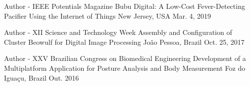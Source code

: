 

\begin{cventries}

\cventry
   {Author - IEEE Potentials Magazine} %
   {Bubu Digital: A Low-Cost Fever-Detecting Pacifier Using the Internet of Things} %
    {New Jersey, USA} %
    {Mar. 4, 2019} %
    {
    }
    
  \cventry
    {Author - XII Science and Technology Week} %
    {Assembly and Configuration of Cluster Beowulf for Digital Image Processing} %
    {João Pessoa, Brazil} %
    {Oct. 25, 2017} %
    {
    }
        
  \cventry
    {Author - XXV Brazilian Congress on Biomedical Engineering} %
    {Development of a Multiplatform Application for Posture Analysis and Body Measurement} %
    {Foz do Iguaçu, Brazil} %
    {Out. 2016} %
    {
    }


    

\end{cventries}
